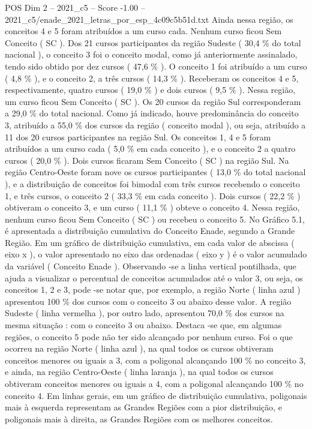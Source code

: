 \begin{textsample}{POS Dim 2 – 2021\_c5 – Score -1.00 – 2021\_c5/enade\_2021\_letras\_por\_esp\_4c09c5b51d.txt}
Ainda nessa região, os conceitos 4 e 5 foram atribuídos a um curso cada.
Nenhum curso ficou Sem Conceito ( SC ).
Dos 21 cursos participantes da região Sudeste ( 30,4 \% do total nacional ), o conceito 3 foi o conceito modal, como já anteriormente assinalado, tendo sido obtido por dez cursos ( 47,6 \% ).
O conceito 1 foi atribuído a um curso ( 4,8 \% ), e o conceito 2, a três cursos ( 14,3 \% ).
Receberam os conceitos 4 e 5, respectivamente, quatro cursos ( 19,0 \% ) e dois cursos ( 9,5 \% ).
Nessa região, um curso ficou Sem Conceito ( SC ).
Os 20 cursos da região Sul corresponderam a 29,0 \% do total nacional.
Como já indicado, houve predominância do conceito 3, atribuído a 55,0 \% dos cursos da região ( conceito modal ), ou seja, atribuído a 11 dos 20 cursos participantes na região Sul.
Os conceitos 1, 4 e 5 foram atribuídos a um curso cada ( 5,0 \% em cada conceito ), e o conceito 2 a quatro cursos ( 20,0 \% ).
Dois cursos ficaram Sem Conceito ( SC ) na região Sul.
Na região Centro-Oeste foram nove os cursos participantes ( 13,0 \% do total nacional ), e a distribuição de conceitos foi bimodal com três cursos recebendo o conceito 1, e três cursos, o conceito 2 ( 33,3 \% em cada conceito ).
Dois cursos ( 22,2 \% ) obtiveram o conceito 3, e um curso ( 11,1 \% ) obteve o conceito 4.
Nessa região, nenhum curso ficou Sem Conceito ( SC ) ou recebeu o conceito 5.
No Gráfico 5.1, é apresentada a distribuição cumulativa do Conceito Enade, segundo a Grande Região.
Em um gráfico de distribuição cumulativa, em cada valor de abscissa ( eixo x ), o valor apresentado no eixo das ordenadas ( eixo y ) é o valor acumulado da variável ( Conceito Enade ).
Observando -se a linha vertical pontilhada, que ajuda a visualizar o percentual de conceitos acumulados até o valor 3, ou seja, os conceitos 1, 2 e 3, pode -se notar que, por exemplo, a região Norte ( linha azul ) apresentou 100 \% dos cursos com o conceito 3 ou abaixo desse valor.
A região Sudeste ( linha vermelha ), por outro lado, apresentou 70,0 \% dos cursos na mesma situação : com o conceito 3 ou abaixo.
Destaca -se que, em algumas regiões, o conceito 5 pode não ter sido alcançado por nenhum curso.
Foi o que ocorreu na região Norte ( linha azul ), na qual todos os cursos obtiveram conceitos menores ou iguais a 3, com a poligonal alcançando 100 \% no conceito 3, e ainda, na região Centro-Oeste ( linha laranja ), na qual todos os cursos obtiveram conceitos menores ou iguais a 4, com a poligonal alcançando 100 \% no conceito 4.
Em linhas gerais, em um gráfico de distribuição cumulativa, poligonais mais à esquerda representam as Grandes Regiões com a pior distribuição, e poligonais mais à direita, as Grandes Regiões com os melhores conceitos.

\end{textsample}
